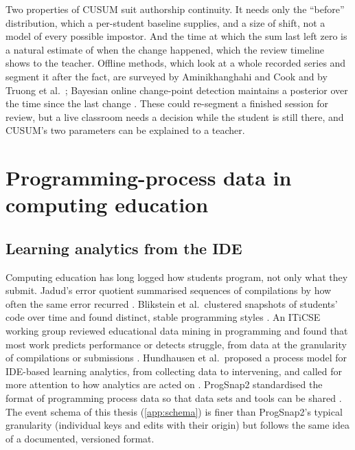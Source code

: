 Two properties of CUSUM suit authorship continuity. It needs only the
``before'' distribution, which a per-student baseline supplies, and a
size of shift, not a model of every possible impostor. And the time at which
the sum last left zero is a natural estimate of when the change happened,
which the review timeline shows to the teacher. Offline methods, which look
at a whole recorded series and segment it after the fact, are surveyed by
Aminikhanghahi and Cook \cite{aminikhanghahi2017survey} and by Truong et al.\
\cite{truong2020selective}; Bayesian online change-point detection maintains a
posterior over the time since the last change \cite{adams2007bocpd}. These
could re-segment a finished session for review, but a live classroom needs a
decision while the student is still there, and CUSUM's two parameters can be
explained to a teacher.

\section{Programming-process data in computing education}
\label{sec:rw-process}

\subsection{Learning analytics from the IDE}
Computing education has long logged how students program, not only what they
submit. Jadud's error quotient summarised sequences of compilations by how
often the same error recurred \cite{jadud2006methods}. Blikstein et al.\
clustered snapshots of students' code over time and found distinct, stable
programming styles \cite{blikstein2014pluralism}. An ITiCSE working group
reviewed educational data mining in programming and found that most work
predicts performance or detects struggle, from data at the granularity of
compilations or submissions \cite{ihantola2015edm}. Hundhausen et al.\ proposed
a process model for IDE-based learning analytics, from collecting data to
intervening, and called for more attention to how analytics are acted on
\cite{hundhausen2017ide}. ProgSnap2 standardised the format of programming
process data so that data sets and tools can be shared
\cite{price2020progsnap2}. The event schema of this thesis
(\cref{app:schema}) is finer than ProgSnap2's typical granularity
(individual keys and edits with their origin) but follows the same idea of a
documented, versioned format.

